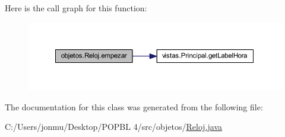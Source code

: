 Here is the call graph for this function\+:\nopagebreak
\begin{figure}[H]
\begin{center}
\leavevmode
\includegraphics[width=350pt]{classobjetos_1_1_reloj_a8568b99d4457c01294d2078b033330a4_cgraph}
\end{center}
\end{figure}


The documentation for this class was generated from the following file\+:\begin{DoxyCompactItemize}
\item 
C\+:/\+Users/jonmu/\+Desktop/\+P\+O\+P\+B\+L 4/src/objetos/\mbox{\hyperlink{_reloj_8java}{Reloj.\+java}}\end{DoxyCompactItemize}
